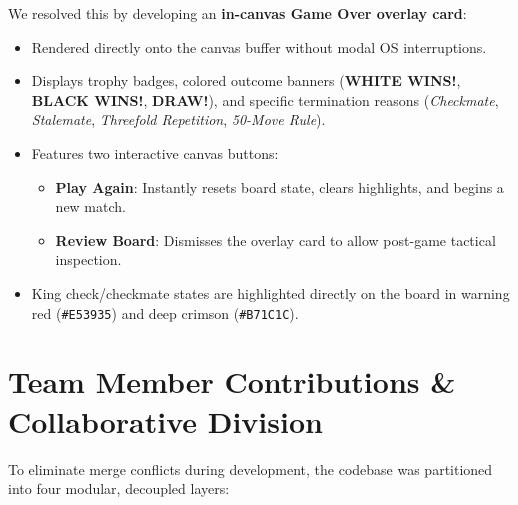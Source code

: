 \documentclass[11pt,a4paper]{article}
\begin{document}
We resolved this by developing an \textbf{in-canvas Game Over overlay card}:
\begin{itemize}[leftmargin=*]
    \item Rendered directly onto the canvas buffer without modal OS interruptions.
    \item Displays trophy badges, colored outcome banners (\textbf{WHITE WINS!}, \textbf{BLACK WINS!}, \textbf{DRAW!}), and specific termination reasons (\textit{Checkmate}, \textit{Stalemate}, \textit{Threefold Repetition}, \textit{50-Move Rule}).
    \item Features two interactive canvas buttons:
    \begin{itemize}
        \item \textbf{Play Again}: Instantly resets board state, clears highlights, and begins a new match.
        \item \textbf{Review Board}: Dismisses the overlay card to allow post-game tactical inspection.
    \end{itemize}
    \item King check/checkmate states are highlighted directly on the board in warning red (\texttt{\#E53935}) and deep crimson (\texttt{\#B71C1C}).
\end{itemize}

\section{Team Member Contributions \& Collaborative Division}

To eliminate merge conflicts during development, the codebase was partitioned into four modular, decoupled layers:
\end{document}

